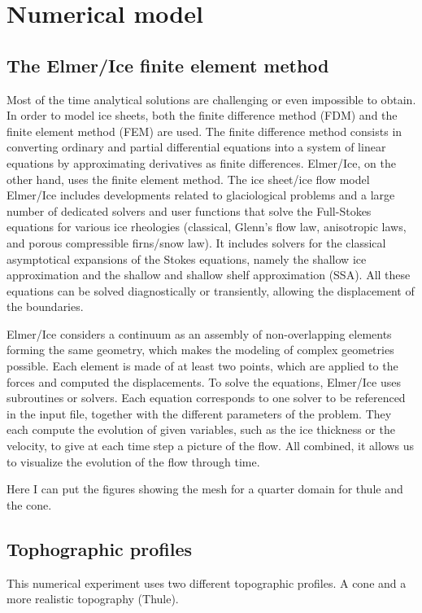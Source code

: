 \documentclass{article}
\begin{document}
 \section{Numerical model}
 \subsection{The Elmer/Ice finite element method}
 Most of the time analytical solutions are challenging or even impossible to obtain. In order to model ice sheets, both the finite difference method (FDM) and the finite element method (FEM) are used. The finite difference method consists in converting ordinary and partial differential equations into a system of linear equations by approximating derivatives as finite differences. Elmer/Ice, on the other hand, uses the finite element method.
 The ice sheet/ice flow model Elmer/Ice includes developments related to glaciological problems and a large number of dedicated solvers and user functions that solve the Full-Stokes equations for various ice rheologies (classical, Glenn's flow law, anisotropic laws, and porous compressible firns/snow law). It includes solvers for the classical asymptotical expansions of the Stokes equations, namely the shallow ice approximation and the shallow and shallow shelf approximation (SSA). All these equations can be solved diagnostically or transiently, allowing the displacement of the boundaries.

 Elmer/Ice considers a continuum as an assembly of non-overlapping elements forming the same geometry, which makes the modeling of complex geometries possible. Each element is made of at least two points, which are applied to the forces and computed the displacements. To solve the equations, Elmer/Ice uses subroutines or solvers. Each equation corresponds to one solver to be referenced in the input file, together with the different parameters of the problem. They each compute the evolution of given variables, such as the ice thickness or the velocity, to give at each time step a picture of the flow. All combined, it allows us to visualize the evolution of the flow through time.

 Here I can put the figures showing the mesh for a quarter domain for thule and the cone.

\subsection{Tophographic profiles}
This numerical experiment uses two different topographic profiles. A cone and a more realistic topography (Thule).
\end{document}
